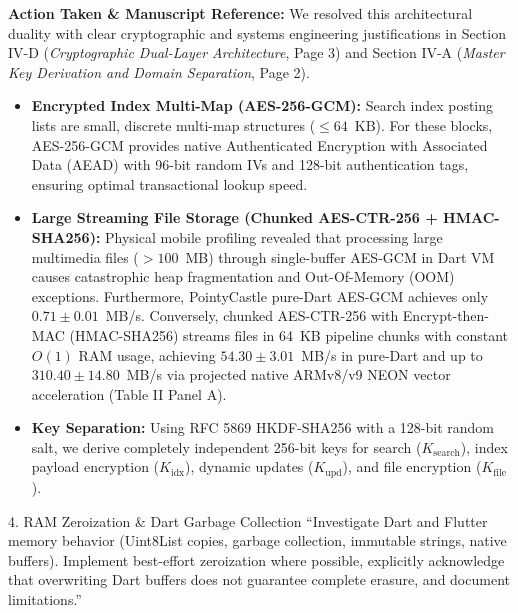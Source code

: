 \documentclass[11pt,a4paper]{article}
\begin{document}
\begin{responsebox}
\textbf{Action Taken \& Manuscript Reference:} We resolved this architectural duality with clear cryptographic and systems engineering justifications in Section IV-D (\emph{Cryptographic Dual-Layer Architecture}, Page 3) and Section IV-A (\emph{Master Key Derivation and Domain Separation}, Page 2).

\begin{itemize}[itemsep=2pt]
    \item \textbf{Encrypted Index Multi-Map (AES-256-GCM):} Search index posting lists are small, discrete multi-map structures ($\le 64$~KB). For these blocks, AES-256-GCM provides native Authenticated Encryption with Associated Data (AEAD) with 96-bit random IVs and 128-bit authentication tags, ensuring optimal transactional lookup speed.
    \item \textbf{Large Streaming File Storage (Chunked AES-CTR-256 + HMAC-SHA256):} Physical mobile profiling revealed that processing large multimedia files ($> 100$~MB) through single-buffer AES-GCM in Dart VM causes catastrophic heap fragmentation and Out-Of-Memory (OOM) exceptions. Furthermore, PointyCastle pure-Dart AES-GCM achieves only $0.71 \pm 0.01$~MB/s. Conversely, chunked AES-CTR-256 with Encrypt-then-MAC (HMAC-SHA256) streams files in 64~KB pipeline chunks with constant $O(1)$ RAM usage, achieving $54.30 \pm 3.01$~MB/s in pure-Dart and up to $310.40 \pm 14.80$~MB/s via projected native ARMv8/v9 NEON vector acceleration (Table II Panel A).
    \item \textbf{Key Separation:} Using RFC 5869 HKDF-SHA256 with a 128-bit random salt, we derive completely independent 256-bit keys for search ($K_{\text{search}}$), index payload encryption ($K_{\text{idx}}$), dynamic updates ($K_{\text{upd}}$), and file encryption ($K_{\text{file}}$).
\end{itemize}
\end{responsebox}

\vspace{1em}

\begin{reviewbox}{4. RAM Zeroization \& Dart Garbage Collection}
``Investigate Dart and Flutter memory behavior (Uint8List copies, garbage collection, immutable strings, native buffers). Implement best-effort zeroization where possible, explicitly acknowledge that overwriting Dart buffers does not guarantee complete erasure, and document limitations.''
\end{reviewbox}
\end{document}
